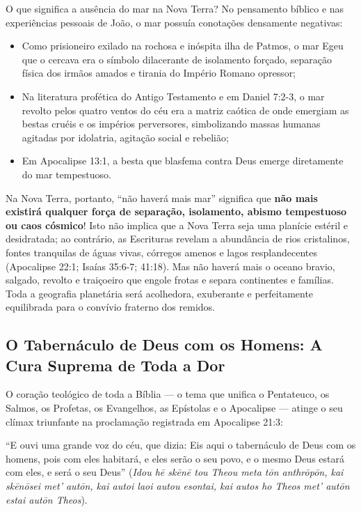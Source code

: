 \documentclass[11pt,a4paper,openany]{book}
\begin{document}
O que significa a ausência do mar na Nova Terra?
No pensamento bíblico e nas experiências pessoais de João, o mar possuía conotações densamente negativas:
\begin{itemize}
  \item Como prisioneiro exilado na rochosa e inóspita ilha de Patmos, o mar Egeu que o cercava era o símbolo dilacerante de isolamento forçado, separação física dos irmãos amados e tirania do Império Romano opressor;
  \item Na literatura profética do Antigo Testamento e em Daniel 7:2-3, o mar revolto pelos quatro ventos do céu era a matriz caótica de onde emergiam as bestas cruéis e os impérios perversores, simbolizando massas humanas agitadas por idolatria, agitação social e rebelião;
  \item Em Apocalipse 13:1, a besta que blasfema contra Deus emerge diretamente do mar tempestuoso.
\end{itemize}


Na Nova Terra, portanto, ``não haverá mais mar'' significa que \textbf{não mais existirá qualquer força de separação, isolamento, abismo tempestuoso ou caos cósmico}!
Isto não implica que a Nova Terra seja uma planície estéril e desidratada; ao contrário, as Escrituras revelam a abundância de rios cristalinos, fontes tranquilas de águas vivas, córregos amenos e lagos resplandecentes (Apocalipse 22:1; Isaías 35:6-7; 41:18). Mas não haverá mais o oceano bravio, salgado, revolto e traiçoeiro que engole frotas e separa continentes e famílias. Toda a geografia planetária será acolhedora, exuberante e perfeitamente equilibrada para o convívio fraterno dos remidos.



\subsection{O Tabernáculo de Deus com os Homens: A Cura Suprema de Toda a Dor}


O coração teológico de toda a Bíblia — o tema que unifica o Pentateuco, os Salmos, os Profetas, os Evangelhos, as Epístolas e o Apocalipse — atinge o seu clímax triunfante na proclamação registrada em Apocalipse 21:3:

``E ouvi uma grande voz do céu, que dizia: Eis aqui o tabernáculo de Deus com os homens, pois com eles habitará, e eles serão o seu povo, e o mesmo Deus estará com eles, e será o seu Deus'' (\textit{Idou hē skēnē tou Theou meta tōn anthrōpōn, kai skēnōsei met' autōn, kai autoi laoi autou esontai, kai autos ho Theos met' autōn estai autōn Theos}).
\end{document}
